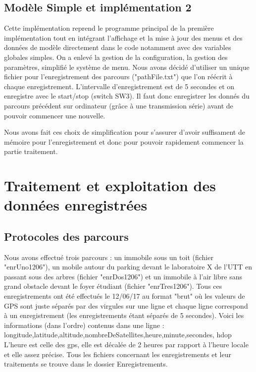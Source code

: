 \documentclass{report}
\begin{document}
\section{Modèle Simple et implémentation 2}

Cette implémentation reprend le programme principal de la première
implémentation tout en intégrant l'affichage et la mise à jour des 
menus et des données de modèle directement dans le code notamment
avec des variables globales simples. On a enlevé la gestion de la
configuration, la gestion des paramètres, simplifié le système de menu.
Nous avons décidé d'utiliser un unique fichier pour l'enregistrement des
parcours ("pathFile.txt") que l'on réécrit à chaque enregistrement. L'intervalle
d'enregistrement est de 5 secondes et on enregistre avec le start/stop
(switch SW3). Il faut donc enregistrer les donnés du parcours précédent
sur ordinateur (grâce à une transmission série) avant de pouvoir
commencer une nouvelle.

Nous avons fait ces choix de simplification pour s'assurer d'avoir
 suffisament de mémoire pour l'enregistrement et donc pour pouvoir 
 rapidement commencer la partie traitement.



\chapter{Traitement et exploitation des données enregistrées}
\section{Protocoles des parcours}
Nous avons effectué trois parcours : un immobile sous un toit (fichier
"enrUno1206"), un mobile autour du parking devant le laboratoire X de
l'UTT en passant sous des arbres (fichier "enrDos1206") et un immobile 
à l'air libre sans grand obstacle devant le foyer étudiant (fichier 
"enrTres1206").
Tous ces enregistrements ont été effectués le 12/06/17 au format "brut"
où les valeurs de GPS sont juste séparés par des virgules sur une ligne
et chaque ligne correspond à un enregistrement (les enregistrements
étant séparés de 5 secondes). Voici les informations (dans l'ordre) 
contenus dans une ligne : \\
longitude,latitude,altitude,nombreDeSatellites,heure,minute,secondes,
hdop \\
L'heure est celle des gps, elle est décalée de 2 heures par rapport
à l'heure locale et elle assez précise.
Tous les fichiers concernant les enregistrements et leur traitements
se trouve dans le dossier Enregistrements.
\end{document}
